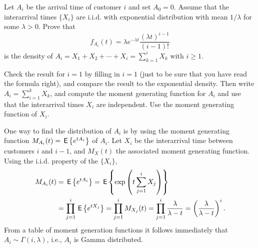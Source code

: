   \begin{exercise}
 Let $A_i$ be the arrival time of customer $i$ and set $A_0=0$.
    Assume that the interarrival times $\{X_i\}$ are i.i.d.  with
    exponential distribution with mean $1/\lambda$ for some
    $\lambda>0$.  Prove that
\begin{equation*}
f_{A_i}(t) = \lambda e^{-\lambda t} \frac{(\lambda t)^{i-1}}{(i-1)!}
\end{equation*}
is  the density of $A_i=X_1+X_2+\cdots+X_i=\sum_{k=1}^i X_k$ with $i\geq 1$. 
\begin{hint}
 Check the result for $i=1$ by filling in $i=1$ (just to be
     sure that you have read the formula right), and compare the result
     to the exponential density. Then write $A_i =\sum_{i=1}^k X_k$, and compute the moment
     generating function for $A_i$ and use that the interarrival times
     $X_i$ are independent. Use the moment generating function  of $X_i$.
\end{hint}
\begin{solution}
 One way to find the distribution of $A_i$ is by using the
    moment generating function $M_{A_i}(t) = \,\mathsf{E}\left\{e^{t A_i}\right\}$ of
    $A_i$. Let $X_i$ be the interarrival time between customers $i$
    and $i-1$, and $M_X(t)$ the associated moment generating
    function. Using the i.i.d. property of the $\{X_i\}$,
\begin{equation*}
  \begin{split}
  M_{A_i}(t) &= \,\mathsf{E}\left\{e^{t A_i}\right\} = \,\mathsf{E}\left\{\exp\left(t\sum_{j=1}^{i} X_j\right)\right\} \\
& = \prod_{j=1}^{i} \,\mathsf{E}\left\{e^{tX_j}\right\} = 
\prod_{j=1}^{i} M_{X_j}(t) = 
\prod_{j=1}^{i} \frac{\lambda}{\lambda -t }
 = \left(\frac{\lambda}{\lambda -t }\right)^i.
  \end{split}
\end{equation*}
From a table of moment generation functions it follows immediately that
$A_i \sim \Gamma(i,\lambda)$, i.e., $A_i$ is Gamma distributed.
\end{solution}
\end{exercise}

